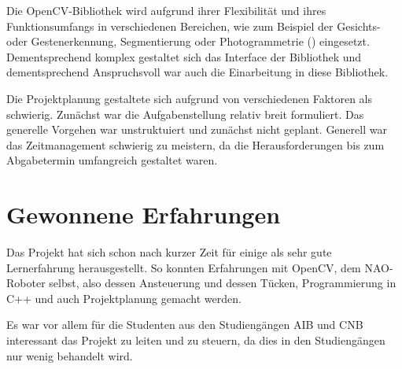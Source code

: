         Die OpenCV-Bibliothek wird aufgrund ihrer Flexibilität und ihres
        Funktionsumfangs in verschiedenen Bereichen, wie zum Beispiel der
        Gesichts- oder Gestenerkennung, Segmentierung oder Photogrammetrie
        (\cite{wiki:opencv}) eingesetzt.
        Dementsprechend komplex gestaltet sich das Interface der Bibliothek und
        dementsprechend Anspruchsvoll war auch die Einarbeitung in diese
        Bibliothek.

        Die Projektplanung gestaltete sich aufgrund von verschiedenen Faktoren
        als schwierig.
        Zunächst war die Aufgabenstellung relativ breit formuliert.
        Das generelle Vorgehen war unstruktuiert und zunächst nicht geplant.
        Generell war das Zeitmanagement schwierig zu meistern, da die
        Herausforderungen bis zum Abgabetermin umfangreich gestaltet waren.

    \section{Gewonnene Erfahrungen}

        Das Projekt hat sich schon nach kurzer Zeit für einige als sehr gute
        Lernerfahrung herausgestellt.
        So konnten Erfahrungen mit OpenCV, dem NAO-Roboter selbst, also dessen
        Ansteuerung und dessen Tücken, Programmierung in C++ und auch
        Projektplanung gemacht werden.

        Es war vor allem für die Studenten aus den Studiengängen AIB und CNB
        interessant das Projekt zu leiten und zu steuern, da dies in den
        Studiengängen nur wenig behandelt wird.

